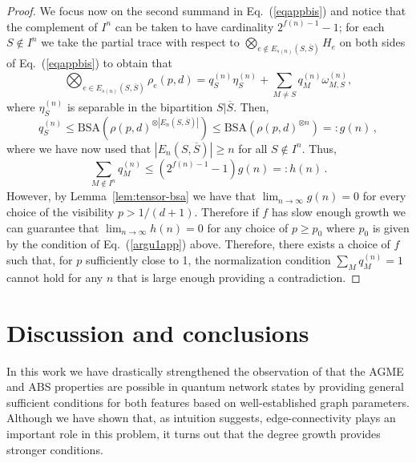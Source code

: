 \documentclass[a4paper,onecolumn,accepted=2024-12-14]{quantumarticle}
\theoremstyle{plain}
\begin{document}
\begin{proof}
We focus now on the second summand in Eq.~(\ref{eqappbis}) and notice that the complement of $I^n$ can be taken to have cardinality $2^{f(n)-1}-1$; for each $S\notin I^n$ we take the partial trace with respect to $\bigotimes_{e\notin E_{s(n)}(S,\overline{S})}H_e$ on both sides of Eq.~(\ref{eqappbis}) to obtain that
\begin{equation}
\bigotimes_{e\in E_{s(n)}(S,\overline{S})}\rho_{e}(p,d)=q_S^{(n)}\eta_S^{(n)}+\sum_{M\neq S}q_M^{(n)}\omega_{M,S}^{(n)},
\end{equation}
where $\eta_S^{(n)}$ is separable in the bipartition $S|\overline{S}$. Then,
\begin{equation}
q_S^{(n)}\leq \mathrm{BSA}\left(\rho(p,d)^{\otimes |E_n(S,\overline{S})|}\right)
         \leq \mathrm{BSA}\left(\rho(p,d)^{\otimes n}\right)=:g(n)\, ,
\end{equation}
where we have now used that $|E_n(S,\overline{S})|\geq n$ for all $S\notin I^n$. Thus,
\begin{equation}
\sum_{M\notin I^n}q_M^{(n)}\leq\left(2^{f(n)-1}-1\right)g(n)=:h(n)\,.
\end{equation}
However, by Lemma~\ref{lem:tensor-bsa} we have that $\lim_{n\to\infty}g(n)=0$ for every choice of the visibility $p>1/(d+1)$. Therefore if $f$ has slow enough growth we can guarantee that $\lim_{n\to\infty}h(n)=0$ for any choice of $p\geq p_0$ where $p_0$ is given by the condition of Eq.~(\ref{argu1app}) above. Therefore, there exists a choice of $f$ such that, for $p$ sufficiently close to 1, the normalization condition
$\sum_Mq_M^{(n)}=1$ cannot hold for any $n$ that is large enough providing a contradiction.
\end{proof}


\section{Discussion and conclusions}\label{secconcl}

In this work we have drastically strengthened the observation of \cite{ASGME} that the AGME and ABS properties are possible in quantum network states by providing general sufficient conditions for both features based on well-established graph parameters. Although we have shown that, as intuition suggests, edge-connectivity plays an important role in this problem, it turns out that the degree growth provides stronger conditions.
\end{document}
